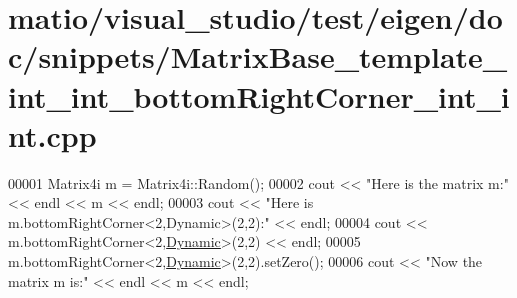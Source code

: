 \hypertarget{matio_2visual__studio_2test_2eigen_2doc_2snippets_2_matrix_base__template__int__int__bottom_right_corner__int__int_8cpp_source}{}\section{matio/visual\+\_\+studio/test/eigen/doc/snippets/\+Matrix\+Base\+\_\+template\+\_\+int\+\_\+int\+\_\+bottom\+Right\+Corner\+\_\+int\+\_\+int.cpp}
\label{matio_2visual__studio_2test_2eigen_2doc_2snippets_2_matrix_base__template__int__int__bottom_right_corner__int__int_8cpp_source}

\begin{DoxyCode}
00001 Matrix4i m = Matrix4i::Random();
00002 cout << \textcolor{stringliteral}{"Here is the matrix m:"} << endl << m << endl;
00003 cout << \textcolor{stringliteral}{"Here is m.bottomRightCorner<2,Dynamic>(2,2):"} << endl;
00004 cout << m.bottomRightCorner<2,\hyperlink{namespace_eigen_ad81fa7195215a0ce30017dfac309f0b2}{Dynamic}>(2,2) << endl;
00005 m.bottomRightCorner<2,\hyperlink{namespace_eigen_ad81fa7195215a0ce30017dfac309f0b2}{Dynamic}>(2,2).setZero();
00006 cout << \textcolor{stringliteral}{"Now the matrix m is:"} << endl << m << endl;
\end{DoxyCode}
